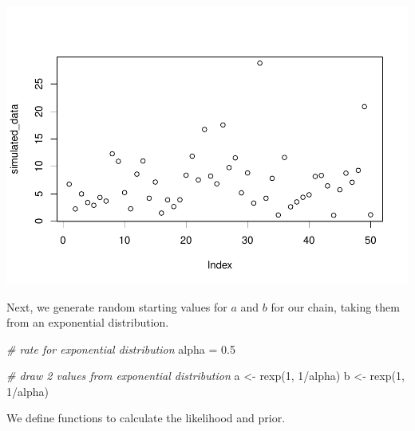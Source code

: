 \documentclass[
]{article}
\newenvironment{Shaded}{\begin{snugshade}}{\end{snugshade}}
\newcommand{\CommentTok}[1]{\textcolor[rgb]{0.56,0.35,0.01}{\textit{#1}}}
\newcommand{\DecValTok}[1]{\textcolor[rgb]{0.00,0.00,0.81}{#1}}
\newcommand{\FloatTok}[1]{\textcolor[rgb]{0.00,0.00,0.81}{#1}}
\newcommand{\FunctionTok}[1]{\textcolor[rgb]{0.00,0.00,0.00}{#1}}
\newcommand{\NormalTok}[1]{#1}
\newcommand{\OtherTok}[1]{\textcolor[rgb]{0.56,0.35,0.01}{#1}}
\newcommand{\SpecialCharTok}[1]{\textcolor[rgb]{0.00,0.00,0.00}{#1}}
\begin{document}
\includegraphics{supplement_files/figure-latex/true-1.pdf}

Next, we generate random starting values for \(a\) and \(b\) for our
chain, taking them from an exponential distribution.

\begin{Shaded}
\begin{Highlighting}[]
\CommentTok{\# rate for exponential distribution}
\NormalTok{alpha }\OtherTok{=} \FloatTok{0.5}

\CommentTok{\# draw 2 values from exponential distribution}
\NormalTok{a }\OtherTok{\textless{}{-}} \FunctionTok{rexp}\NormalTok{(}\DecValTok{1}\NormalTok{, }\DecValTok{1}\SpecialCharTok{/}\NormalTok{alpha)}
\NormalTok{b }\OtherTok{\textless{}{-}} \FunctionTok{rexp}\NormalTok{(}\DecValTok{1}\NormalTok{, }\DecValTok{1}\SpecialCharTok{/}\NormalTok{alpha)}
\end{Highlighting}
\end{Shaded}

We define functions to calculate the likelihood and prior.
\end{document}
